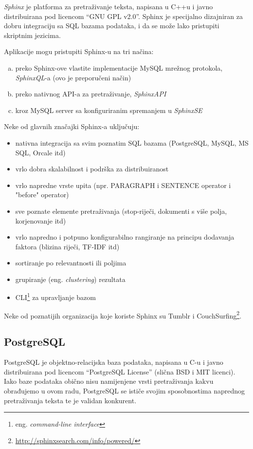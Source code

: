 \documentclass[a4paper,twoside,12pt]{scrreprt}
\begin{document}
\textit{Sphinx} je platforma za pretraživanje teksta, napisana u C++u i javno distribuirana pod licencom ``GNU GPL v2.0''. Sphinx je specijalno dizajniran za dobru integraciju sa SQL bazama podataka, i da se može lako pristupiti skriptnim jezicima.

Aplikacije mogu pristupiti Sphinx-u na tri načina:

\begin{enumerate}[(a)]
  \item preko Sphinx-ove vlastite implementacije MySQL mrežnog protokola, \textit{SphinxQL}-a (ovo je preporučeni način)
  \item preko nativnog API-a za pretraživanje, \textit{SphinxAPI}
  \item kroz MySQL server sa konfiguriranim spremanjem u \textit{SphinxSE}
\end{enumerate}

Neke od glavnih značajki Sphinx-a uključuju:

\begin{itemize}
  \item nativna integracija sa svim poznatim SQL bazama (PostgreSQL, MySQL, MS SQL, Orcale itd)
  \item vrlo dobra skalabilnost i podrška za distribuiranost
  \item vrlo napredne vrste upita (npr. PARAGRAPH i SENTENCE operator i "before" operator)
  \item sve poznate elemente pretraživanja (stop-riječi, dokumenti s više polja, korjenovanje itd)
  \item vrlo napredno i potpuno konfigurabilno rangiranje na principu dodavanja faktora (blizina riječi, TF-IDF itd)
  \item sortiranje po relevantnosti ili poljima
  \item grupiranje (eng. \textit{clustering}) rezultata
  \item CLI\footnote{eng. \textit{command-line interface}} za upravljanje bazom
\end{itemize}

Neke od poznatijih organizacija koje koriste Sphinx su Tumblr i CouchSurfing\footnote{\url{http://sphinxsearch.com/info/powered/}}.

\subsection{PostgreSQL}

PostgreSQL je objektno-relacijska baza podataka, napisana u C-u i javno distribuirana pod licencom ``PostgreSQL License'' (slična BSD i MIT licenci). Iako baze podataka obično nisu namijenjene vrsti pretraživanja kakvu obrađujemo u ovom radu, PostgreSQL se ističe svojim sposobnostima naprednog pretraživanja teksta te je validan konkurent.
\end{document}
